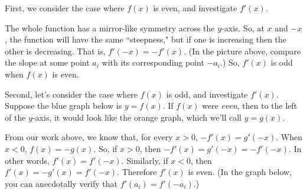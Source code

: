 \begin{solution}
\begin{description}
First, we consider the case where $f(x)$ is even, and investigate $f'(x)$.
\begin{center}
\end{center}

The whole function has a mirror-like symmetry across the $y$-axis. So, at $x$ and $-x$, the function will have the same ``steepness," but if one is increasing then the other is decreasing. That is, $f'(-x)=-f'(x)$. (In the picture above, compare the slope at some point $a_i$ with its corresponding point $-a_i$.) So, $f'(x)$ is odd when $f(x)$ is even.

Second, let's consider the case where $f(x)$ is odd, and investigate $f'(x)$. Suppose the blue graph below is $y=f(x)$. If $f(x)$ were \emph{even}, then to the left of the $y$-axis, it would look like the orange graph, which we'll call $y=g(x)$.

\begin{center}
\end{center}

From our work above, we know that, for every $x>0$, $-f'(x)=g'(-x)$. When $x<0$, $f(x)=-g(x)$. So, if $x>0$, then $-f'(x)=g'(-x)=-f'(-x)$. In other words, $f'(x)=f'(-x)$. Similarly, if $x<0$, then $f'(x)=-g'(x)=f'(-x)$. Therefore $f'(x)$ is even. (In the graph below, you can anecdotally verify that $f'(a_i)=f'(-a_i)$.)


\end{description}
\end{solution}
